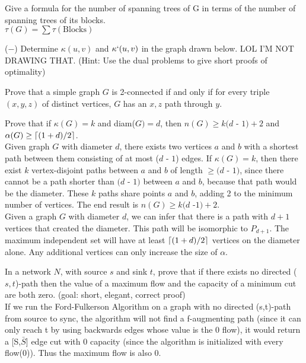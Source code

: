 \documentclass[12pt]{article}
\DeclarePairedDelimiter{\ceil}{\lceil}{\rceil}
\newenvironment{question}[2][Question]{\begin{trivlist}
\item[\hskip \labelsep {\bfseries #1}\hskip \labelsep {\bfseries #2.}]}{\end{trivlist}}
\begin{document}
\begin{question}{5}
	Give a formula for the number of spanning trees of G in terms of the number of spanning trees of its blocks.	\\
	$\tau(G) = \sum{\tau(\text{Blocks})}$
\end{question}

\begin{question}{6}
($-$) Determine $\kappa(u,v)$ and $\kappa`(u,v)$ in the graph drawn below. LOL I'M NOT DRAWING THAT. (Hint: Use the dual problems to give short proofs of optimality)
\end{question}

\begin{question}{7}
Prove that a simple graph $G$ is 2-connected if and only if for every triple $(x, y, z)$ of distinct vertices, $G$ has an $x, z$ path through $y$.
\end{question}

\begin{question}{8}
Prove that if $\kappa(G) = k$ and diam($G) = d$, then $n(G) \geq k(d$ - $ 1) + 2$ and $\alpha(G) \geq \ceil[big]{(1 + d)/2}$.
\\
Given graph $G$ with diameter $d$, there exists two vertices $a$ and $b$ with a shortest path between them consisting of at most ($d$ - $1$) edges.  If $\kappa(G) = k$, then there exist $k$ vertex-disjoint paths between $a$ and $b$ of length $\geq (d$ - $1)$, since there cannot be a path shorter than $(d$ - $1)$ between $a$ and $b$, because that path would be the diameter.  These $k$ paths share points $a$ and $b$, adding 2 to the minimum number of vertices.  The end result is $n(G) \geq k(d$ -$1) +2$.  \\

\noindent
Given a graph $G$ with diameter $d$, we can infer that there is a path with $d+1$ vertices that created the diameter.  This path will be isomorphic to $P_{d+1}$.  The maximum independent set will have at least $\ceil[big]{(1 + d)/2}$ vertices on the diameter alone.  Any additional vertices can only increase the size of $\alpha$.



\end{question}

\begin{question}{9}
In a network $N$, with source $s$ and sink $t$, prove that if there exists no directed ($s, t$)-path then the value of a maximum flow and the capacity of a minimum cut are both zero. (goal: short, elegant, correct proof) \\

If we run the Ford-Fulkerson Algorithm on a graph with no directed (s,t)-path from source to sync, the algorithm will not find a f-augmenting path (since it can only reach t by using backwards edges whose value is the 0 flow), it would return a [S,$\bar{S}$] edge cut with 0 capacity (since the algorithm is initialized with every flow(0)). Thus the maximum flow is also 0.
\end{question}
\end{document}
